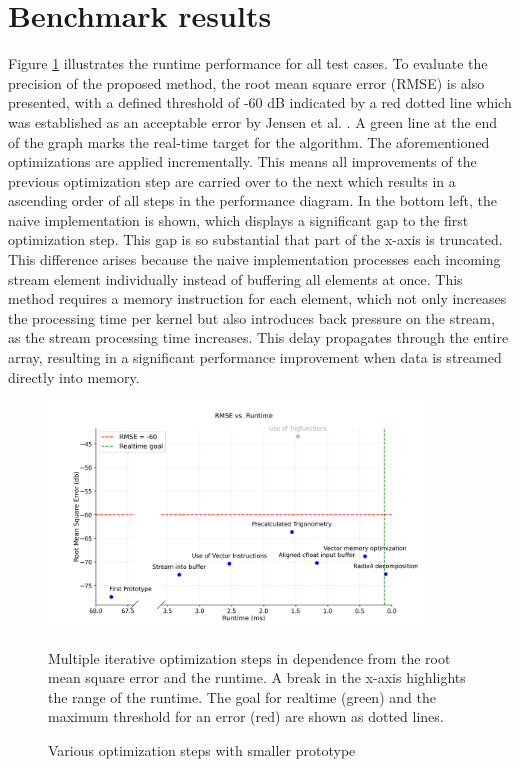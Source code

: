 \section{Benchmark results}
Figure \ref{fig:plot1} illustrates the runtime performance for all test cases. To evaluate the precision of the proposed method, the root mean square error (RMSE) is also presented, with a defined threshold of -60 dB indicated by a red dotted line which was established as an acceptable error by Jensen et al. \cite{jens}. A green line at the end of the graph marks the real-time target for the algorithm. The aforementioned optimizations are applied incrementally. This means all improvements of the previous optimization step are carried over to the next which results in a ascending order of all steps in the performance diagram. In the bottom left, the naive implementation is shown, which displays a significant gap to the first optimization step. This gap is so substantial that part of the x-axis is truncated. This difference arises because the naive implementation processes each incoming stream element individually instead of buffering all elements at once. This method requires a memory instruction for each element, which not only increases the processing time per kernel but also introduces back pressure on the stream, as the stream processing time increases. This delay propagates through the entire array, resulting in a significant performance improvement when data is streamed directly into memory.\par

\begin{figure}[h]
    \centering
    \includegraphics[width=0.9\textwidth]{images/simple_plot.png}
    \captionsetup{justification=centering}
    \caption{Various optimization steps with smaller prototype}
        Multiple iterative optimization steps in dependence from the root mean square error and the runtime. A break in the x-axis highlights the range of the runtime. The goal for realtime (green) and the maximum threshold for an error (red) are shown as dotted lines. 
    \label{fig:plot1}
\end{figure}

